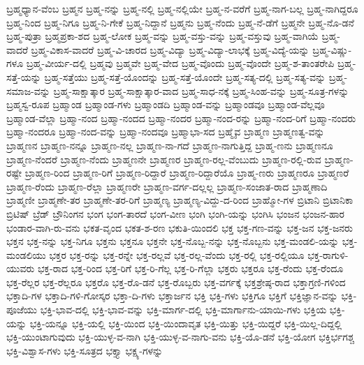 ಬ್ರಹ್ಮಧ್ಯಾನ-ವೆಂಬ
ಬ್ರಹ್ಮನ
ಬ್ರಹ್ಮ-ನನ್ನು
ಬ್ರಹ್ಮ-ನಲ್ಲಿ
ಬ್ರಹ್ಮ-ನಲ್ಲಿಯೇ
ಬ್ರಹ್ಮ-ನ-ವರೆಗೆ
ಬ್ರಹ್ಮ-ನಾಗ-ಬಲ್ಲ
ಬ್ರಹ್ಮ-ನಾಗಿದ್ದರೂ
ಬ್ರಹ್ಮ-ನಿಂದ
ಬ್ರಹ್ಮ-ನಿಗೂ
ಬ್ರಹ್ಮ-ನಿ-ಗೇಕೆ
ಬ್ರಹ್ಮ-ನಿದ್ದಾನೆ
ಬ್ರಹ್ಮನು
ಬ್ರಹ್ಮ-ನೆಂದು
ಬ್ರಹ್ಮ-ನೆ-ಡೆಗೆ
ಬ್ರಹ್ಮನೇ
ಬ್ರಹ್ಮ-ನೊ-ಡನೆ
ಬ್ರಹ್ಮ-ಪುತ್ರಾ
ಬ್ರಹ್ಮಪ್ರಕಾ-ಶದ
ಬ್ರಹ್ಮ-ಲೋಕ
ಬ್ರಹ್ಮ-ವನ್ನು
ಬ್ರಹ್ಮ-ವಸ್ತು-ವನ್ನು
ಬ್ರಹ್ಮ-ವಸ್ತುವು
ಬ್ರಹ್ಮ-ವಾಗಿಯೆ
ಬ್ರಹ್ಮ-ವಾದರೆ
ಬ್ರಹ್ಮ-ವಿಕಾಸ-ವಾದರೆ
ಬ್ರಹ್ಮ-ವಿ-ಚಾರದ
ಬ್ರಹ್ಮ-ವಿದ್ಯಾ
ಬ್ರಹ್ಮ-ವಿದ್ಯಾ-ಲಾಭಕ್ಕೆ
ಬ್ರಹ್ಮ-ವಿದ್ಯೆ-ಯನ್ನು
ಬ್ರಹ್ಮ-ವಿಷ್ಣು-ಗಳೂ
ಬ್ರಹ್ಮ-ವೀರ್ಯ-ದಲ್ಲಿ
ಬ್ರಹ್ಮವು
ಬ್ರಹ್ಮವೇ
ಬ್ರಹ್ಮ-ವೇದ
ಬ್ರಹ್ಮ-ವೊಂದು
ಬ್ರಹ್ಮ-ವೊಂದೇ
ಬ್ರಹ್ಮ-ಶ-ತಾಂತರೇಪಿ
ಬ್ರಹ್ಮ-ಸತ್ತೆ-ಯನ್ನು
ಬ್ರಹ್ಮ-ಸತ್ತೆಯು
ಬ್ರಹ್ಮ-ಸತ್ತೆ-ಯೊಂದನ್ನು
ಬ್ರಹ್ಮ-ಸತ್ತೆ-ಯೊಂದೇ
ಬ್ರಹ್ಮ-ಸತ್ಯ-ದಲ್ಲಿ
ಬ್ರಹ್ಮ-ಸತ್ಯ-ವನ್ನು
ಬ್ರಹ್ಮ-ಸಮಾಜ-ವನ್ನು
ಬ್ರಹ್ಮ-ಸಾಕ್ಷಾತ್ಕಾರ
ಬ್ರಹ್ಮ-ಸಾಕ್ಷಾತ್ಕಾರ-ವಾದ
ಬ್ರಹ್ಮ-ಸಾಧ-ನಕ್ಕೆ
ಬ್ರಹ್ಮ-ಸಿಂಹ-ವನ್ನು
ಬ್ರಹ್ಮ-ಸೂತ್ರ-ಗಳನ್ನು
ಬ್ರಹ್ಮಸ್ವ-ರೂಪ
ಬ್ರಹ್ಮಾಂಡ
ಬ್ರಹ್ಮಾಂಡ-ಗಳು
ಬ್ರಹ್ಮಾಂಡದಿ
ಬ್ರಹ್ಮಾಂಡ-ವನ್ನು
ಬ್ರಹ್ಮಾಂಡವೂ
ಬ್ರಹ್ಮಾಂಡ-ವೆಲ್ಲವೂ
ಬ್ರಹ್ಮಾಂಡ-ವೆಲ್ಲಾ
ಬ್ರಹ್ಮಾ-ನಂದ
ಬ್ರಹ್ಮಾ-ನಂದದ
ಬ್ರಹ್ಮಾ-ನಂದರ
ಬ್ರಹ್ಮಾ-ನಂದ-ರನ್ನು
ಬ್ರಹ್ಮಾ-ನಂದ-ರಿಗೆ
ಬ್ರಹ್ಮಾ-ನಂದರು
ಬ್ರಹ್ಮಾ-ನಂದರೂ
ಬ್ರಹ್ಮಾ-ನಂದ-ವನ್ನು
ಬ್ರಹ್ಮಾ-ನಂದವೂ
ಬ್ರಹ್ಮಾಭಾ-ಸದ
ಬ್ರಹ್ಮೈವ
ಬ್ರಾಹ್ಮಣ
ಬ್ರಾಹ್ಮಣತ್ವ-ವನ್ನು
ಬ್ರಾಹ್ಮಣನ
ಬ್ರಾಹ್ಮಣ-ನನ್ನೂ
ಬ್ರಾಹ್ಮಣ-ನಲ್ಲ
ಬ್ರಾಹ್ಮಣ-ನಾ-ಗದೆ
ಬ್ರಾಹ್ಮಣ-ನಾಗುತ್ತಿದ್ದ
ಬ್ರಾಹ್ಮ-ಣನು
ಬ್ರಾಹ್ಮಣನೂ
ಬ್ರಾಹ್ಮಣ-ನೆಂದರೆ
ಬ್ರಾಹ್ಮಣ-ನೆಂದು
ಬ್ರಾಹ್ಮಣನೇ
ಬ್ರಾಹ್ಮಣರ
ಬ್ರಾಹ್ಮಣ-ರಲ್ಲ-ವೆಂಬುದು
ಬ್ರಾಹ್ಮಣ-ರಲ್ಲಿ-ರುವ
ಬ್ರಾಹ್ಮಣ-ರಷ್ಟೇ
ಬ್ರಾಹ್ಮಣ-ರಿಂದ
ಬ್ರಾಹ್ಮಣ-ರಿಗೆ
ಬ್ರಾಹ್ಮಣ-ರಿದ್ದಾರೆ
ಬ್ರಾಹ್ಮಣ-ರಿದ್ದಾರೆಯೊ
ಬ್ರಾಹ್ಮ-ಣರು
ಬ್ರಾಹ್ಮಣರೂ
ಬ್ರಾಹ್ಮಣರೆ
ಬ್ರಾಹ್ಮಣ-ರೆಂದು
ಬ್ರಾಹ್ಮಣ-ರೆಲ್ಲಾ
ಬ್ರಾಹ್ಮಣರೇ
ಬ್ರಾಹ್ಮಣ-ವರ್ಗ-ದಲ್ಲಲ್ಲ
ಬ್ರಾಹ್ಮಣ-ಸಂಜಾತ-ರಾದ
ಬ್ರಾಹ್ಮಣಾದಿ
ಬ್ರಾಹ್ಮಣೀ
ಬ್ರಾಹ್ಮಣೇ-ತರ
ಬ್ರಾಹ್ಮಣೇ-ತರ-ರಿಗೆ
ಬ್ರಾಹ್ಮಣ್ಯ
ಬ್ರಾಹ್ಮಣ್ಯ-ವಿದ್ದು-ದ-ರಿಂದ
ಬ್ರಾಹ್ಮೋ-ಗಳ
ಬ್ರಿಟಾನಿ
ಬ್ರಿಟಾನಿಕಾ
ಬ್ರಿಟಿಷ್
ಬ್ರೆಡ್
ಬ್ರೌನಿಂಗನ
ಭಂಗ
ಭಂಗ-ತಾರದೆ
ಭಂಗ-ವೀಣ
ಭಂಗಿ
ಭಂಗಿ-ಯನ್ನು
ಭಂಗಿಸಿ
ಭಂಜನ
ಭಂಜನ-ಹಾರ
ಭಂಡಾರ-ವಾಗಿ-ರು-ವನು
ಭಕತ-ವೃಂದ
ಭಕತ-ಶ-ರಣ
ಭಕುತಿ-ಯಿಂದಲಿ
ಭಕ್ತ
ಭಕ್ತ-ಗಣ-ವನ್ನು
ಭಕ್ತ-ಜನ
ಭಕ್ತ-ಜನರು
ಭಕ್ತನ
ಭಕ್ತ-ನನ್ನು
ಭಕ್ತ-ನಿಗೂ
ಭಕ್ತನು
ಭಕ್ತನೂ
ಭಕ್ತನೇ
ಭಕ್ತ-ನೊಬ್ಬ-ನನ್ನು
ಭಕ್ತ-ನೊಬ್ಬನು
ಭಕ್ತ-ಮಂಡಲಿ-ಯನ್ನು
ಭಕ್ತ-ಮಂಡಲಿಯು
ಭಕ್ತರ
ಭಕ್ತ-ರನ್ನು
ಭಕ್ತ-ರನ್ನೇ
ಭಕ್ತ-ರಲ್ಲವೆ
ಭಕ್ತ-ರಲ್ಲ-ವೆಂದು
ಭಕ್ತ-ರಲ್ಲಿ
ಭಕ್ತ-ರಲ್ಲಿಯೂ
ಭಕ್ತ-ರಾಗುಳಿ-ಯುವರು
ಭಕ್ತ-ರಾದ
ಭಕ್ತ-ರಿಂದ
ಭಕ್ತ-ರಿಗೆ
ಭಕ್ತ-ರಿ-ಗೆಲ್ಲ
ಭಕ್ತ-ರಿ-ಗೆಲ್ಲಾ
ಭಕ್ತರು
ಭಕ್ತರೂ
ಭಕ್ತ-ರೆಂದು
ಭಕ್ತ-ರೆಂದೂ
ಭಕ್ತ-ರೆಲ್ಲರ
ಭಕ್ತ-ರೆಲ್ಲರೂ
ಭಕ್ತರೊ
ಭಕ್ತ-ರೊ-ಡನೆ
ಭಕ್ತ-ರೊಬ್ಬರು
ಭಕ್ತ-ವರ್ಗಕ್ಕೆ
ಭಕ್ತಶ್ರೇಷ್ಠ-ರಾದ
ಭಕ್ತಾಗ್ರಣಿ-ಗಳಿಂದ
ಭಕ್ತಾದಿ-ಗಳ
ಭಕ್ತಾದಿ-ಗಳಿ-ಗೋಸ್ಕರ
ಭಕ್ತಾ-ದಿ-ಗಳು
ಭಕ್ತಾರ್ಜನ
ಭಕ್ತಿ
ಭಕ್ತಿ-ಗಳು
ಭಕ್ತಿಗೂ
ಭಕ್ತಿಗೆ
ಭಕ್ತಿಜ್ಞಾನ-ವನ್ನು
ಭಕ್ತಿ-ಪೂಜೆಯು
ಭಕ್ತಿ-ಭಾವ-ದಲ್ಲಿ
ಭಕ್ತಿ-ಭಾವ-ವನ್ನು
ಭಕ್ತಿ-ಮಾರ್ಗ-ದಲ್ಲಿ
ಭಕ್ತಿ-ಮಾರ್ಗಾನು-ಯಾಯಿ-ಗಳು
ಭಕ್ತಿಯ
ಭಕ್ತಿ-ಯನ್ನು
ಭಕ್ತಿ-ಯನ್ನೂ
ಭಕ್ತಿ-ಯಲ್ಲಿ
ಭಕ್ತಿ-ಯಿಂದ
ಭಕ್ತಿ-ಯಿಂದಾವೃತ
ಭಕ್ತಿ-ಯಿತ್ತು
ಭಕ್ತಿ-ಯಿದ್ದರೆ
ಭಕ್ತಿ-ಯಿಲ್ಲ-ದಿದ್ದಲ್ಲಿ
ಭಕ್ತಿ-ಯುಂಟಾಗುವುದು
ಭಕ್ತಿ-ಯುಳ್ಳ-ವ-ನಾಗಿ
ಭಕ್ತಿ-ಯುಳ್ಳ-ವ-ನಾಗು-ವನು
ಭಕ್ತಿ-ಯೊ-ಡನೆ
ಭಕ್ತಿ-ಯೋಗ
ಭಕ್ತಿರ್ಭಗಶ್ಚ
ಭಕ್ತಿ-ವಿಶ್ವಾಸ-ಗಳು
ಭಕ್ತಿ-ಸೂತ್ರದ
ಭಕ್ತ್ಯಾ
ಭಕ್ಷ್ಯ-ಗಳನ್ನು

